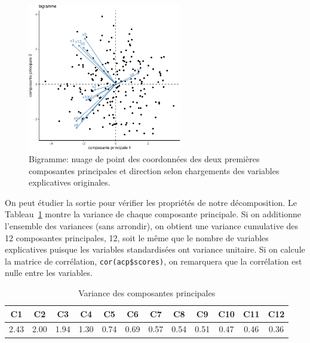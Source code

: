 \documentclass[
  11pt,
  letterpaper,
]{scrbook}
\theoremstyle{definition}
\theoremstyle{remark}
\begin{document}
\begin{figure}[ht!]

{\centering \includegraphics[width=0.6\textwidth,height=\textheight]{./02-analysefactorielle_files/figure-pdf/fig-biplot-1.pdf}

}

\caption{\label{fig-biplot}Bigramme: nuage de point des coordonnées des
deux premières composantes principales et direction selon chargements
des variables explicatives originales.}

\end{figure}

On peut étudier la sortie pour vérifier les propriétés de notre
décomposition. Le Tableau~\ref{tbl-eigenvalues} montre la variance de
chaque composante principale. Si on additionne l'ensemble des variances
(sans arrondir), on obtient une variance cumulative des 12 composantes
principales, 12, soit le même que le nombre de variables explicatives
puisque les variables standardisées ont variance unitaire. Si on calcule
la matrice de corrélation, \texttt{cor(acp\$scores)}, on remarquera que
la corrélation est nulle entre les variables.

\hypertarget{tbl-eigenvalues}{}
\begin{table}
\caption{\label{tbl-eigenvalues}Variance des composantes principales }\tabularnewline

\centering
\begin{tabular}{cccccccccccc}
\toprule
C1 & C2 & C3 & C4 & C5 & C6 & C7 & C8 & C9 & C10 & C11 & C12\\
\midrule
2.43 & 2.00 & 1.94 & 1.30 & 0.74 & 0.69 & 0.57 & 0.54 & 0.51 & 0.47 & 0.46 & 0.36\\
\bottomrule
\end{tabular}
\end{table}
\end{document}
